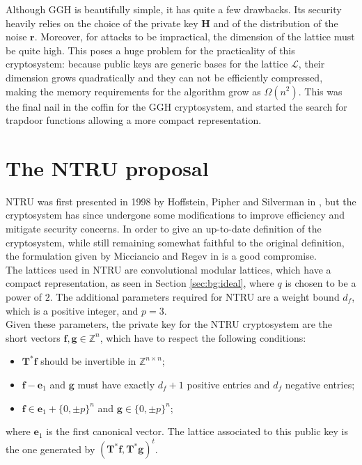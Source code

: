 Although GGH is beautifully simple, it has quite a few drawbacks. Its security heavily relies on the choice of the private key $\mathbf{H}$ and of the distribution of the noise $\mathbf{r}$. Moreover, for attacks to be impractical, the dimension of the lattice must be quite high. This poses a huge problem for the practicality of this cryptosystem: because public keys are generic bases for the lattice $\mathscr{L}$, their dimension grows quadratically and they can not be efficiently compressed, making the memory requirements for the algorithm grow as $\Omega(n^2)$. This was the final nail in the coffin for the GGH cryptosystem, and started the search for trapdoor functions allowing a more compact representation.

\section{The NTRU proposal}
NTRU was first presented in 1998 by Hoffstein, Pipher and Silverman in \cite{NTRU}, but the cryptosystem has since undergone some modifications to improve efficiency and mitigate security concerns. In order to give an up-to-date definition of the cryptosystem, while still remaining somewhat faithful to the original definition, the formulation given by Micciancio and Regev in \cite{PQC} is a good compromise.\\
The lattices used in NTRU are convolutional modular lattices, which have a compact representation, as seen in Section \ref{sec:bg:ideal}, where $q$ is chosen to be a power of $2$. The additional parameters required for NTRU are a weight bound $d_f$, which is a positive integer, and $p=3$.\\
Given these parameters, the private key for the NTRU cryptosystem are the short vectors $\mathbf{f},\mathbf{g}\in\mathbb{Z}^{n}$, which have to respect the following conditions:
\begin{itemize}
\item $\mathbf{T}^*\mathbf{f}$ should be invertible in $\mathbb{Z}^{n\times n}$;
\item $\mathbf{f}-\mathbf{e}_1$ and $\mathbf{g}$ must have exactly $d_f+1$ positive entries and $d_f$ negative entries;
\item $\mathbf{f}\in\mathbf{e}_1+\{0,\pm p\}^n$ and $\mathbf{g}\in\{0,\pm p\}^n$;
\end{itemize}
where $\mathbf{e}_1$ is the first canonical vector.
The lattice associated to this public key is the one generated by $(\mathbf{T}^*\mathbf{f},\mathbf{T}^*\mathbf{g})^t$.\\
